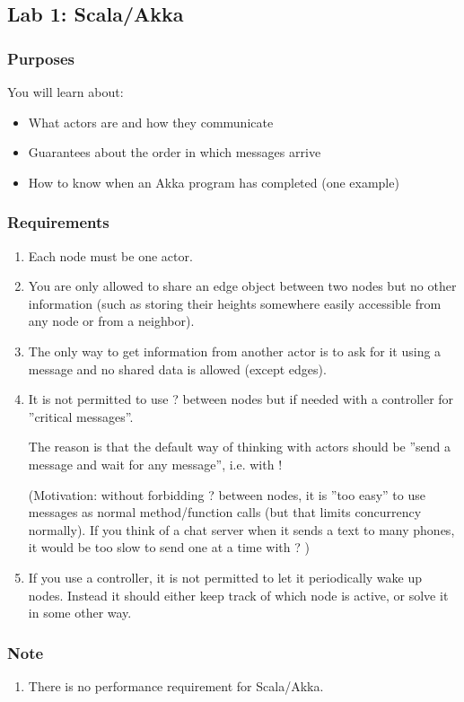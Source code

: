 \documentclass{forsete}
\begin{document}
\newpage
\subsection*{Lab 1: Scala/Akka}
\subsubsection*{Purposes}
You will learn about:
\begin{itemize}
\item What actors are and how they communicate
\item Guarantees about the order in which messages arrive
\item How to know when an Akka program has completed (one example)
\end{itemize}
\subsubsection*{Requirements}
\begin{enumerate}
\item Each node must be one actor.
\item You are only allowed to share an edge object between two nodes but no other information (such as storing their
heights somewhere easily accessible from any node or from a neighbor).
\item The only way to get information from another actor is to ask for it using a message and no shared data is allowed (except edges).
\item It is not permitted to use ? between nodes but if needed with a controller for 
''critical messages''.

The reason is that the default way of thinking with actors should be ''send a message and wait for any message'', i.e. with !

(Motivation: without forbidding ? between nodes, it is ''too easy'' to use messages as normal method/function calls (but that limits concurrency normally).
If you think of a chat server when it sends a text to many phones, it would be too slow to send one at a time with ?
)

\item If you use a controller, it is not permitted to let it periodically wake up nodes. Instead it should either keep 
track of which node is active, or solve it in some other way.
\end{enumerate}

\subsubsection*{Note}
\begin{enumerate}
\item There is no performance requirement for Scala/Akka.
\end{enumerate}
\end{document}
